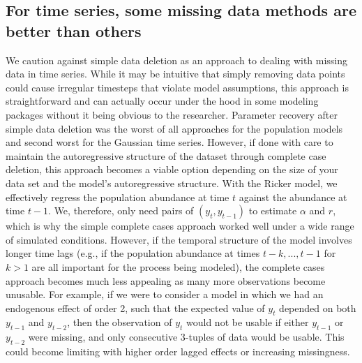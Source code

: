 


\subsection*{For time series, some missing data methods are better than others}

We caution against simple data deletion as an approach to dealing with missing data in time series. While it may be intuitive that simply removing data points could cause irregular timesteps that violate model assumptions, this approach is straightforward and can actually occur under the hood in some modeling packages without it being obvious to the researcher. Parameter recovery after simple data deletion was the worst of all approaches for the population models and second worst for the Gaussian time series. However, if done with care to maintain the autoregressive structure of the dataset through complete case deletion, this approach becomes a viable option depending on the size of your data set and the model's autoregressive structure. With the Ricker model, we effectively regress the population abundance at time $t$ against the abundance at time $t-1$. We, therefore, only need pairs of $(y_t, y_{t-1})$ to estimate $\alpha$ and $r$, which is why the simple complete cases approach worked well under a wide range of simulated conditions. However, if the temporal structure of the model involves longer time lags (e.g., if the population abundance at times $t-k,...,t-1$ for $k > 1$ are all important for the process being modeled), the complete cases approach becomes much less appealing as many more observations become unusable. For example, if we were to consider a model in which we had an endogenous effect of order 2, such that the expected value of $y_t$ depended on both $y_{t-1}$ and $y_{t-2}$, then the observation of $y_t$ would not be usable if either $y_{t-1}$ or $y_{t-2}$ were missing, and only consecutive 3-tuples of data would be usable. This could become limiting with higher order lagged effects or increasing missingness.


